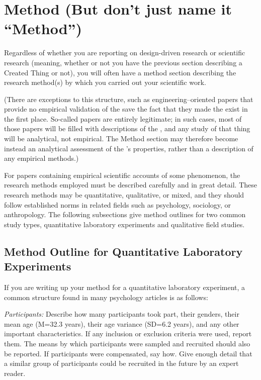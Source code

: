 \section{Method (But don't just name it ``Method'')}

Regardless of whether you are reporting on design-driven research or scientific research (meaning, whether or not you have the previous section describing a Created Thing or not), you will often have a method section describing the research method(s) by which you carried out your scientific work.

(There are exceptions to this structure, such as engineering--oriented papers that provide no empirical validation of the \sysname{} save the fact that they made the \sysname{} exist in the first place. 
So-called  papers are
entirely legitimate; in such cases, most of those papers will be filled with descriptions of the \sysname{}, and any study of that thing will be analytical, not empirical. 
The Method section may therefore become instead an analytical assessment of the \sysname{}’s properties, rather than a description of any empirical methods.)

For papers containing empirical scientific accounts of some phenomenon, the research methods employed must be described carefully and in great detail. 
These research methods may be quantitative, qualitative, or mixed, and they should follow established norms in related fields such as psychology, sociology, or anthropology. 
The following subsections give method outlines for two common study types, quantitative laboratory experiments and qualitative field studies.

\subsection{Method Outline for Quantitative Laboratory Experiments}
If you are writing up your method for a quantitative laboratory experiment, a common structure found in many psychology articles is as follows:

\emph{Participants:} Describe how many participants took part, their genders, their mean age (M=32.3 years), their age variance (SD=6.2 years), and any other important characteristics. 
If any inclusion or exclusion criteria were used, report them.
The means by which participants were sampled and recruited should also be reported. 
If participants were compensated, say how. 
Give enough detail that a similar group of participants could be recruited in the future by an expert reader.

